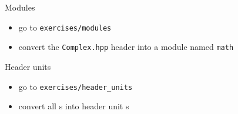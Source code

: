 \begin{frame}[fragile]
  \begin{exercise}{Modules}
    \begin{itemize}
      \item go to \texttt{exercises/modules}
      \item convert the \texttt{Complex.hpp} header into a module named \texttt{math}
    \end{itemize}
  \end{exercise}
  \begin{exercise}{Header units}
    \begin{itemize}
      \item go to \texttt{exercises/header\_units}
      \item convert all s into header unit s
    \end{itemize}
  \end{exercise}
\end{frame}
